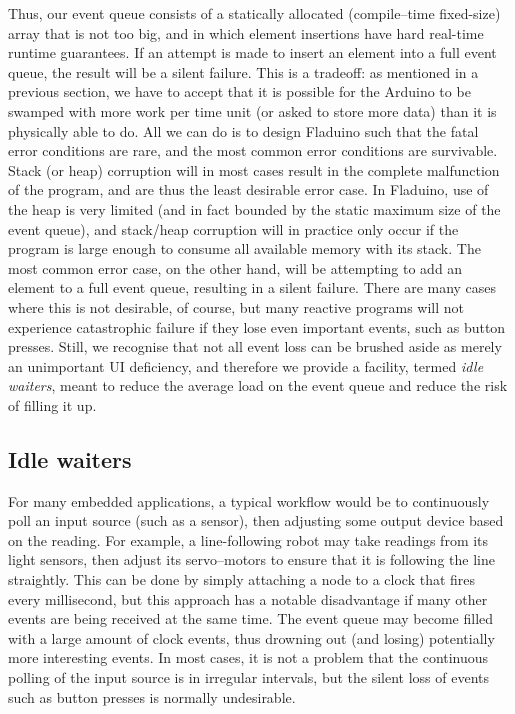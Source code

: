 \documentclass[a4paper, oneside, final]{memoir}
\begin{document}
Thus, our event queue consists of a statically allocated
(compile--time fixed-size) array that is not too big, and in which
element insertions have hard real-time runtime guarantees.  If an
attempt is made to insert an element into a full event queue, the
result will be a silent failure.  This is a tradeoff: as mentioned in
a previous section, we have to accept that it is possible for the
Arduino to be swamped with more work per time unit (or asked to store
more data) than it is physically able to do.  All we can do is to
design Fladuino such that the fatal error conditions are rare, and the
most common error conditions are survivable.  Stack (or heap)
corruption will in most cases result in the complete malfunction of
the program, and are thus the least desirable error case.  In
Fladuino, use of the heap is very limited (and in fact bounded by the
static maximum size of the event queue), and stack/heap corruption
will in practice only occur if the program is large enough to consume
all available memory with its stack.  The most common error case, on
the other hand, will be attempting to add an element to a full event
queue, resulting in a silent failure.  There are many cases where this
is not desirable, of course, but many reactive programs will not
experience catastrophic failure if they lose even important events,
such as button presses.  Still, we recognise that not all event loss
can be brushed aside as merely an unimportant UI deficiency, and
therefore we provide a facility, termed \textit{idle waiters}, meant
to reduce the average load on the event queue and reduce the risk of
filling it up.

\subsection{Idle waiters}

For many embedded applications, a typical workflow would be to
continuously poll an input source (such as a sensor), then adjusting
some output device based on the reading.  For example, a
line-following robot may take readings from its light sensors, then
adjust its servo--motors to ensure that it is following the line
straightly.  This can be done by simply attaching a node to a clock
that fires every millisecond, but this approach has a notable
disadvantage if many other events are being received at the same time.
The event queue may become filled with a large amount of clock events,
thus drowning out (and losing) potentially more interesting events.
In most cases, it is not a problem that the continuous polling of the
input source is in irregular intervals, but the silent loss of events
such as button presses is normally undesirable.
\end{document}
